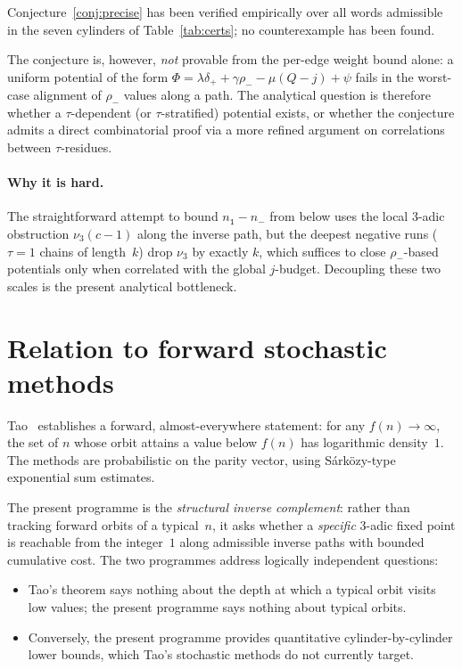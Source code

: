 \documentclass[11pt,a4paper]{article}
\theoremstyle{plain}
\theoremstyle{definition}
\newcommand{\numOnes}{n_{\mathtt{1}}}
\newcommand{\numNeg}{n_{\!-}}
\begin{document}
Conjecture~\ref{conj:precise} has been verified empirically over all
words admissible in the seven cylinders of Table~\ref{tab:certs};
no counterexample has been found.

The conjecture is, however, \emph{not} provable from the per-edge
weight bound alone: a uniform potential of the form
$\Phi = \lambda \delta_+ + \gamma \rho_- - \mu(Q - j) + \psi$ fails
in the worst-case alignment of $\rho_-$ values along a path. The
analytical question is therefore whether a $\tau$-dependent (or
$\tau$-stratified) potential exists, or whether the conjecture
admits a direct combinatorial proof via a more refined argument on
correlations between $\tau$-residues.

\paragraph{Why it is hard.} The straightforward attempt to bound
$\numOnes - \numNeg$ from below uses the local 3-adic obstruction
$\nu_3(c - 1)$ along the inverse path, but the deepest negative runs
($\tau = 1$ chains of length~$k$) drop $\nu_3$ by exactly $k$, which
suffices to close $\rho_-$-based potentials only when correlated with
the global $j$-budget. Decoupling these two scales is the present
analytical bottleneck.

\section{Relation to forward stochastic methods}\label{sec:relation}

Tao~\cite{tao2022} establishes a forward, almost-everywhere
statement: for any $f(n) \to \infty$, the set of $n$ whose orbit
attains a value below $f(n)$ has logarithmic density~$1$. The
methods are probabilistic on the parity vector, using Sárközy-type
exponential sum estimates.

The present programme is the \emph{structural inverse complement}:
rather than tracking forward orbits of a typical~$n$, it asks whether
a \emph{specific} 3-adic fixed point is reachable from the integer~$1$
along admissible inverse paths with bounded cumulative cost. The
two programmes address logically independent questions:
\begin{itemize}
  \item Tao's theorem says nothing about the depth at which a typical
        orbit visits low values; the present programme says nothing
        about typical orbits.
  \item Conversely, the present programme provides quantitative
        cylinder-by-cylinder lower bounds, which Tao's stochastic
        methods do not currently target.
\end{itemize}
\end{document}
